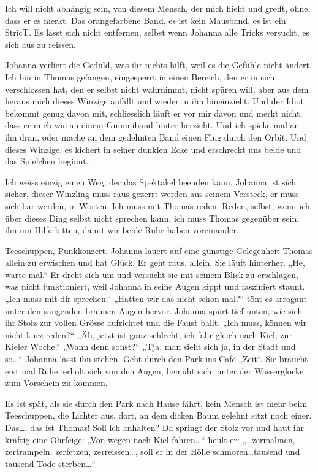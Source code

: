 \documentclass[10pt,titlepage,a5paper]{book}
\begin{document}
Ich will nicht abhängig sein, von diesem Mensch, der mich flieht und greift, ohne, dass er es merkt. Das orangefarbene Band, es ist kein Mausband, es ist ein StricT. Es lässt sich nicht entfernen, selbst wenn Johanna alle Tricks versucht, es sich aus zu reissen. 

Johanna verliert die Geduld, was ihr nichts hilft, weil es die Gefühle nicht ändert. Ich bin in Thomas gefangen, eingesperrt in einen Bereich, den er in sich verschlossen hat, den er selbst nicht wahrnimmt, nicht spüren will, aber aus dem heraus mich dieses Winzige anfällt und wieder in ihn hineinzieht. Und der Idiot bekommt genug davon mit, schliesslich läuft er vor mir davon und merkt nicht, dass er mich wie an einem Gummiband hinter herzieht. Und ich spicke mal an ihn dran, oder mache an dem gedehnten Band einen Flug durch den Orbit. Und dieses Winzige, es kichert in seiner dunklen Ecke und erschreckt uns beide und das Spielchen beginnt\dots 

Ich weiss einzig einen Weg, der das Spektakel beenden kann, Johanna ist sich sicher, dieser Winzling muss raus gezerrt werden aus seinem Versteck, er muss sichtbar werden, in Worten. Ich muss mit Thomas reden. Reden, selbst, wenn ich über dieses Ding selbst nicht sprechen kann, ich muss Thomas gegenüber sein, ihn um Hilfe bitten, damit wir beide Ruhe haben voreinander.

Teeschuppen, Punkkonzert. Johanna lauert auf eine günstige Gelegenheit Thomas allein zu erwischen und hat Glück. Er geht raus, allein. Sie läuft hinterher. „He, warte mal.“ Er dreht sich um und versucht sie mit seinem Blick zu erschlagen, was nicht funktioniert, weil Johanna in seine Augen kippt und fasziniert staunt. „Ich muss mit dir sprechen.“ „Hatten wir das nicht schon mal?“ tönt es arrogant unter den saugenden braunen Augen hervor. Johanna spürt tief unten, wie sich ihr Stolz zur vollen Grösse aufrichtet und die Faust ballt. „Ich muss, können wir nicht kurz reden?“ „Äh, jetzt ist ganz schlecht, ich fahr gleich nach Kiel, zur Kieler Woche.“ „Wann denn sonst?“ „Tja, man sieht sich ja, in der Stadt und so\dots “ Johanna lässt ihn stehen. Geht durch den Park ins Cafe „Zeit“. Sie braucht erst mal Ruhe, erholt sich von den Augen, bemüht sich, unter der Wasserglocke zum Vorschein zu kommen.

Es ist spät, als sie durch den Park nach Hause fährt, kein Mensch ist mehr beim Teeschuppen, die Lichter aus, dort, an dem dicken Baum gelehnt sitzt noch einer. Das\dots , das ist Thomas!  Soll ich anhalten? Da springt der Stolz vor und haut ihr kräftig eine Ohrfeige: „Von wegen nach Kiel fahren\dots “ heult er: „\dots  zermalmen, zertrampeln, zerfetzen, zerreissen\dots , soll er in der Hölle schmoren\dots  tausend und tausend Tode sterben\dots “
\end{document}
